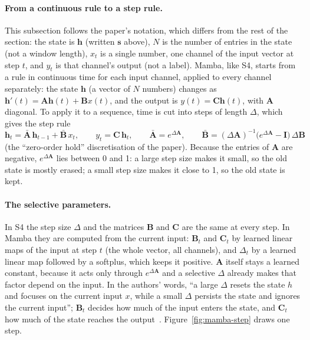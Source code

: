 \paragraph{From a continuous rule to a step rule.} This subsection follows the paper's notation, which differs from
the rest of the section: the state is $\mathbf{h}$ (written $\mathbf{s}$ above), $N$ is the number of entries in the
state (not a window length), $x_t$ is a single number, one channel of the input vector at step $t$, and $y_t$ is that
channel's output (not a label). Mamba, like S4, starts from a rule in continuous time for each input
channel, applied to every channel separately: the state $\mathbf{h}$ (a vector of $N$ numbers) changes as $\mathbf{h}'(t) = \mathbf{A}\mathbf{h}(t) +
\mathbf{B}x(t)$, and the output is $y(t) = \mathbf{C}\mathbf{h}(t)$, with $\mathbf{A}$ diagonal. To apply it to a
sequence, time is cut into steps of length $\Delta$, which gives the step rule
\begin{equation}
  \mathbf{h}_t = \bar{\mathbf{A}}\,\mathbf{h}_{t-1} + \bar{\mathbf{B}}\,x_t, \qquad y_t = \mathbf{C}\,\mathbf{h}_t,
  \qquad \bar{\mathbf{A}} = e^{\Delta \mathbf{A}}, \qquad
  \bar{\mathbf{B}} = (\Delta\mathbf{A})^{-1}\big(e^{\Delta \mathbf{A}} - \mathbf{I}\big)\,\Delta\mathbf{B}
\label{eq:mamba-step}
\end{equation}
(the ``zero-order hold'' discretisation of the paper).
Because the entries of $\mathbf{A}$ are negative, $e^{\Delta\mathbf{A}}$ lies between 0 and 1: a large step size makes
it small, so the old state is mostly erased; a small step size makes it close to 1, so the old state is kept.

\paragraph{The selective parameters.} In S4 the step size $\Delta$ and the matrices $\mathbf{B}$ and $\mathbf{C}$ are the same
at every step. In Mamba they are computed from the current input: $\mathbf{B}_t$ and $\mathbf{C}_t$ by learned linear
maps of the input at step $t$ (the whole vector, all channels), and $\Delta_t$ by a learned linear map followed by a softplus, which keeps it positive. $\mathbf{A}$ itself
stays a learned constant, because it acts only through $e^{\Delta\mathbf{A}}$ and a selective $\Delta$ already makes that
factor depend on the input. In the authors' words, ``a large $\Delta$ resets the state $h$ and focuses on the current
input $x$, while a small $\Delta$ persists the state and ignores the current input''; $\mathbf{B}_t$ decides how much of
the input enters the state, and $\mathbf{C}_t$ how much of the state reaches the output~\citep{gu2024mamba}.
Figure~\ref{fig:mamba-step} draws one step.


